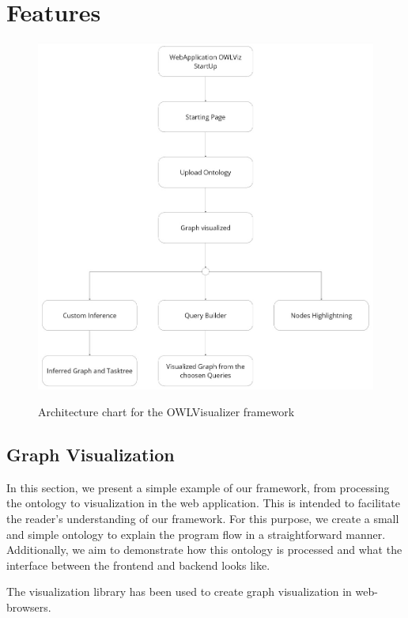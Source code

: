 \section{Features}

\begin{figure}[H]
    \includegraphics[scale=0.35]{Graphics/architecture_simplified.jpg}
    \label{fig:OWLViz_architecture}
    \caption{Architecture chart for the OWLVisualizer framework}
\end{figure}

\subsection{Graph Visualization}
In this section, we present a simple example of our framework, from processing the ontology to visualization in the web application. 
This is intended to facilitate the reader's understanding of our framework. 
For this purpose, we create a small and simple ontology to explain the program flow in a straightforward manner. 
Additionally, we aim to demonstrate how this ontology is processed and what the interface between the frontend and backend looks like.

The visualization library \cite{visjs} has been used to create graph visualization in web-browsers.

